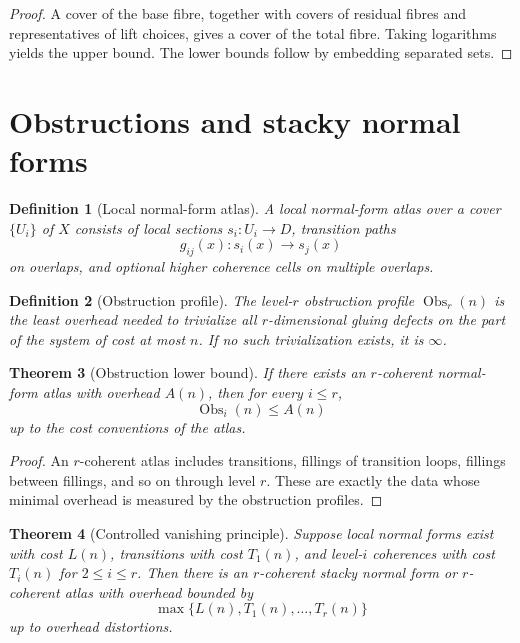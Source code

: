 \documentclass[11pt]{article}
\newtheorem{theorem}{Theorem}[section]
\newtheorem{definition}[theorem]{Definition}
\begin{document}
\begin{proof}
A cover of the base fibre, together with covers of residual fibres and representatives of lift choices, gives a cover of the total fibre.  Taking logarithms yields the upper bound.  The lower bounds follow by embedding separated sets.
\end{proof}

\section{Obstructions and stacky normal forms}

\begin{definition}[Local normal-form atlas]
A local normal-form atlas over a cover \(\{U_i\}\) of \(X\) consists of local sections \(s_i:U_i\to D\), transition paths
\[
g_{ij}(x):s_i(x)\to s_j(x)
\]
on overlaps, and optional higher coherence cells on multiple overlaps.
\end{definition}

\begin{definition}[Obstruction profile]
The level-\(r\) obstruction profile \(\operatorname{Obs}_r(n)\) is the least overhead needed to trivialize all \(r\)-dimensional gluing defects on the part of the system of cost at most \(n\).  If no such trivialization exists, it is \(\infty\).
\end{definition}

\begin{theorem}[Obstruction lower bound]
If there exists an \(r\)-coherent normal-form atlas with overhead \(A(n)\), then for every \(i\le r\),
\[
\operatorname{Obs}_i(n)\le A(n)
\]
up to the cost conventions of the atlas.
\end{theorem}

\begin{proof}
An \(r\)-coherent atlas includes transitions, fillings of transition loops, fillings between fillings, and so on through level \(r\).  These are exactly the data whose minimal overhead is measured by the obstruction profiles.
\end{proof}

\begin{theorem}[Controlled vanishing principle]
Suppose local normal forms exist with cost \(L(n)\), transitions with cost \(T_1(n)\), and level-\(i\) coherences with cost \(T_i(n)\) for \(2\le i\le r\).  Then there is an \(r\)-coherent stacky normal form or \(r\)-coherent atlas with overhead bounded by
\[
\max\{L(n),T_1(n),\ldots,T_r(n)\}
\]
up to overhead distortions.
\end{theorem}
\end{document}
